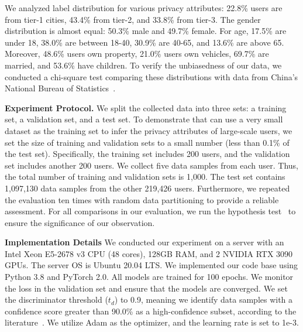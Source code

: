 \noindent\textbf{}
We analyzed label distribution for various privacy attributes: 22.8\% users are from tier-1 cities, 43.4\% from tier-2, and 33.8\% from tier-3. The gender distribution is almost equal: 50.3\% male and 49.7\% female. For age, 17.5\% are under 18, 38.0\% are between 18-40, 30.9\% are 40-65, and 13.6\% are above 65. Moreover, 48.6\% users own property, 21.0\% users own vehicles, 69.7\% are married, and 53.6\% have children. To verify the unbiasedness of our data, we conducted a chi-square test comparing these distributions with data from China’s National Bureau of Statistics~\cite{NBSC}. 

\noindent \textbf{Experiment Protocol.} 
We split the collected data into three sets: a training set, a validation set, and a test set. To demonstrate that \tool can use a very small dataset as the training set to infer the privacy attributes of large-scale users, we set the size of training and validation sets to a small number (less than 0.1\% of the test set). Specifically, the training set includes 200 users, and the validation set includes another 200 users. We collect five data samples from each user. Thus, the total number of training and validation sets is 1,000. The test set contains 1,097,130 data samples from the other 219,426 users.
Furthermore, we repeated the evaluation ten times with random data partitioning to provide a reliable assessment.
For all comparisons in our evaluation, we run the hypothesis test~\cite{chen2023obsan} to ensure the significance of our observation.




\noindent \textbf{Implementation Details}
We conducted our experiment on a server with an Intel Xeon E5-2678 v3 CPU (48
cores), 128GB RAM, and 2 NVIDIA RTX 3090 GPUs. The server OS is Ubuntu 20.04
LTS. We implemented our code base using Python 3.8 and PyTorch 2.0. All models are trained for 100 epochs. 
We monitor the loss in the validation set and ensure that the models are converged.
We set the discriminator threshold ($t_d$) to 0.9, meaning we identify data samples with a confidence score greater than 90.0\% as a high-confidence subset, according to the literature~\cite{kuppers2020multivariate,wang2021confident}. 
We utilize Adam as the optimizer, and the learning rate is set to 1e-3. 

